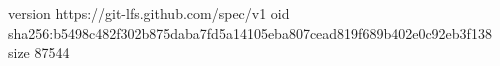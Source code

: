 version https://git-lfs.github.com/spec/v1
oid sha256:b5498c482f302b875daba7fd5a14105eba807cead819f689b402e0c92eb3f138
size 87544
